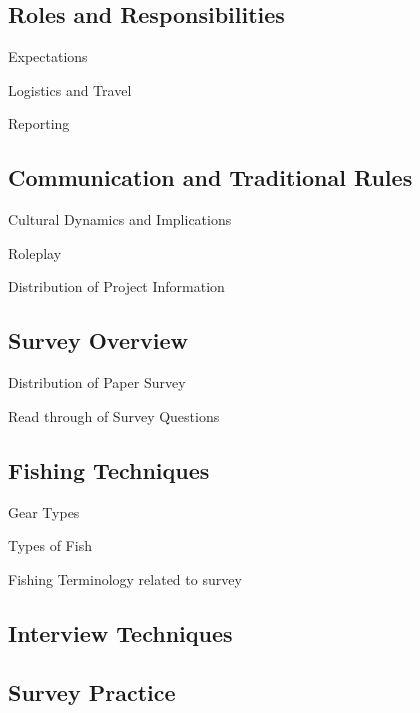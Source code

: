 \documentclass[a4paper,agenda,11pt]{meetingmins}
\begin{document}
\subsection{Roles and Responsibilities}
\begin{subitems}
\item Expectations
\item Logistics and Travel
\item Reporting
\end{subitems}

\subsection{Communication and Traditional Rules}
\begin{subitems}
\item Cultural Dynamics and Implications
\item Roleplay
\item Distribution of Project Information
\end{subitems}

\subsection{Survey Overview}
\begin{subitems}
\item Distribution of Paper Survey
\item Read through of Survey Questions
\end{subitems}

\subsection{Fishing Techniques}
\begin{subitems}
\item Gear Types
\item Types of Fish
\item Fishing Terminology related to survey
\end{subitems}

\subsection{Interview Techniques}

\subsection{Survey Practice}
\end{document}
